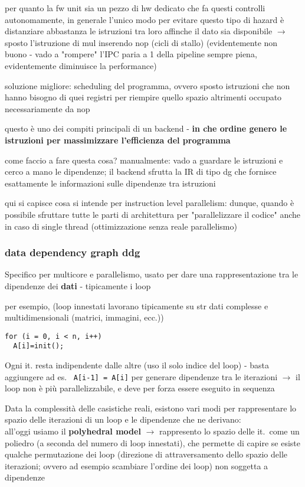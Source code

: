 per quanto la fw unit sia un pezzo di hw dedicato che fa questi controlli autonomamente, in generale l'unico modo per evitare questo tipo di hazard \`e distanziare abbastanza le istruzioni tra loro affinche il dato sia disponibile $\rightarrow$ sposto l'istruzione di mul inserendo nop (cicli di stallo) (evidentemente non buono - vado a "rompere" l'IPC paria a 1 della pipeline sempre piena, evidentemente diminuisce la performance)

soluzione migliore: scheduling del programma, ovvero sposto istruzioni che non hanno bisogno di quei registri per riempire quello spazio altrimenti occupato necessariamente da nop

questo \`e uno dei compiti principali di un backend - \textbf{in che ordine genero le istruzioni per massimizzare l'efficienza del programma}

come faccio a fare questa cosa? manualmente: vado a guardare le istruzioni e cerco a mano le dipendenze; il backend sfrutta la IR di tipo dg che fornisce esattamente le informazioni sulle dipendenze tra istruzioni

qui si capisce cosa si intende per instruction level parallelism: dunque, quando \`e possibile sfruttare tutte le parti di architettura per "parallelizzare il codice" anche in caso di single thread (ottimizzazione senza reale parallelismo)


\subsubsection{data dependency graph ddg}

Specifico per multicore e parallelismo, usato per dare una rappresentazione tra le dipendenze dei \textbf{dati} - tipicamente i loop

per esempio, (loop innestati lavorano tipicamente su str dati complesse e multidimensionali (matrici, immagini, ecc.))

\begin{lstlisting}
for (i = 0, i < n, i++)
  A[i]=init();
\end{lstlisting}


Ogni it. resta indipendente dalle altre (uso il solo indice del loop) - basta aggiungere ad es.~ \lstinline|A[i-1] = A[i]| per generare dipendenze tra le iterazioni $\rightarrow$ il loop non \`e pi\`u parallelizzabile, e deve per forza essere eseguito in sequenza

Data la complessit\`a delle casistiche reali,  esistono vari modi per rappresentare lo spazio delle iterazioni di un loop e le dipendenze che ne derivano:\\
all'oggi usiamo il \textbf{polyhedral model} $\rightarrow$ rappresento lo spazio delle it.~come un poliedro (a seconda del numero di loop innestati), che permette di capire se esiste qualche permutazione dei loop (direzione di attraversamento dello spazio delle iterazioni; ovvero ad esempio scambiare l'ordine dei loop) non soggetta a dipendenze

